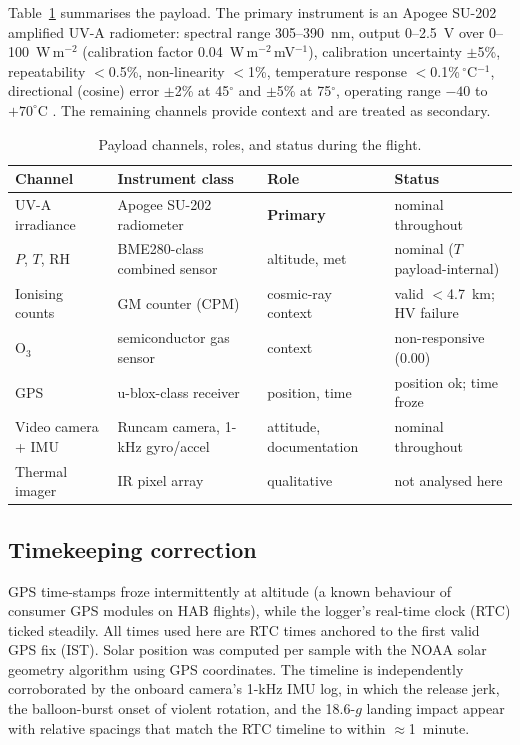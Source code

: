 \documentclass[11pt,a4paper]{article}
\begin{document}
Table~\ref{tab:payload} summarises the payload. The primary instrument is an Apogee SU-202
amplified UV-A radiometer: spectral range 305--390~nm, output 0--2.5~V over
0--100~W\,m$^{-2}$ (calibration factor 0.04~W\,m$^{-2}$\,mV$^{-1}$), calibration
uncertainty $\pm$5\%, repeatability $<$0.5\%, non-linearity $<$1\%, temperature response
$<$0.1\%\,$^\circ$C$^{-1}$, directional (cosine) error $\pm$2\% at 45$^\circ$ and
$\pm$5\% at 75$^\circ$, operating range $-40$ to $+70^\circ$C \cite{apogee}. The remaining
channels provide context and are treated as secondary.

\begin{table}[htbp]
\centering
\footnotesize
\caption{Payload channels, roles, and status during the flight.}
\label{tab:payload}
\begin{tabular}{llll}
\toprule
Channel & Instrument class & Role & Status \\
\midrule
UV-A irradiance & Apogee SU-202 radiometer & \textbf{Primary} & nominal throughout \\
$P$, $T$, RH & BME280-class combined sensor & altitude, met & nominal ($T$ payload-internal) \\
Ionising counts & GM counter (CPM) & cosmic-ray context & valid $<$4.7~km; HV failure \\
O$_3$ & semiconductor gas sensor & context & non-responsive (0.00) \\
GPS & u-blox-class receiver & position, time & position ok; time froze \\
Video camera + IMU & Runcam camera, 1-kHz gyro/accel & attitude, documentation & nominal throughout \\
Thermal imager & IR pixel array & qualitative & not analysed here \\
\bottomrule
\end{tabular}
\end{table}

\subsection{Timekeeping correction}

GPS time-stamps froze intermittently at altitude (a known behaviour of consumer GPS
modules on HAB flights), while the logger's real-time clock (RTC) ticked steadily. All
times used here are RTC times anchored to the first valid GPS fix (IST). Solar position
was computed per sample with the NOAA solar geometry algorithm using GPS coordinates.
The timeline is independently corroborated by the onboard camera's 1-kHz IMU log, in
which the release jerk, the balloon-burst onset of violent rotation, and the 18.6-$g$
landing impact appear with relative spacings that match the RTC timeline to within
$\approx$1~minute.
\end{document}
